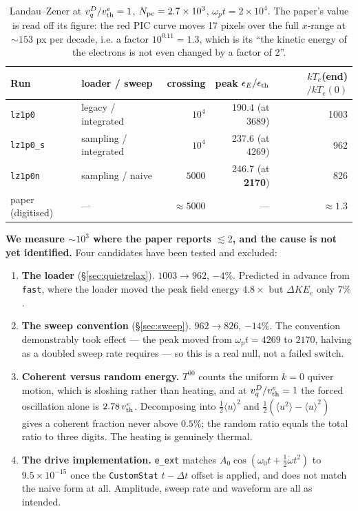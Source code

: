 \documentclass[11pt,a4paper]{article}
\newcommand{\code}[1]{\texttt{\small #1}}
\newcommand{\wpt}{\omega_p t}
\newcommand{\vth}{v_{\rm th}^{e}}
\newcommand{\Npc}{N_{\rm pc}}
\begin{document}
\begin{table}[h]
\centering\small
\begin{tabular}{@{}llrrr@{}}
\toprule
Run & loader / sweep & crossing & peak $\epsilon_E/\epsilon_{\rm th}$ & $kT_e$(end)$/kT_e(0)$ \\
\midrule
\code{lz1p0}   & legacy / integrated   & $10^4$ & 190.4 (at 3689) & 1003 \\
\code{lz1p0\_s}& sampling / integrated & $10^4$ & 237.6 (at 4269) & 962 \\
\code{lz1p0n}  & sampling / naive      & $5000$ & 246.7 (at \textbf{2170}) & 826 \\
\midrule
paper (digitised) & --- & ${\approx}5000$ & --- & \textbf{${\approx}1.3$} \\
\bottomrule
\end{tabular}
\caption{Landau--Zener at $v_q^D/\vth = 1$, $\Npc = 2.7\times10^3$, $\wpt = 2\times10^4$.
The paper's value is read off its figure: the red PIC curve moves 17 pixels over the
full $x$-range at ${\sim}153$ px per decade, i.e. a factor $10^{0.11} = 1.3$, which is
its ``the kinetic energy of the electrons is not even changed by a factor of 2''.}
\end{table}

\textbf{We measure ${\sim}10^3$ where the paper reports ${\lesssim}2$, and the cause
is not yet identified.} Four candidates have been tested and excluded:

\begin{enumerate}[nosep]
  \item \textbf{The loader} (\S\ref{sec:quietrelax}). $1003 \rightarrow 962$, $-4\%$.
        Predicted in advance from \code{fast}, where the loader moved the peak field
        energy $4.8\times$ but $\Delta KE_e$ only $7\%$.
  \item \textbf{The sweep convention} (\S\ref{sec:sweep}). $962 \rightarrow 826$,
        $-14\%$. The convention demonstrably took effect --- the peak moved from
        $\wpt = 4269$ to $2170$, halving as a doubled sweep rate requires --- so this
        is a real null, not a failed switch.
  \item \textbf{Coherent versus random energy.} $T^{00}$ counts the uniform $k=0$
        quiver motion, which is sloshing rather than heating, and at
        $v_q^D/\vth = 1$ the forced oscillation alone is $2.78\,\vth$. Decomposing
        into $\tfrac12\langle u\rangle^2$ and
        $\tfrac12(\langle u^2\rangle - \langle u\rangle^2)$ gives a coherent fraction
        never above $0.5\%$; the random ratio equals the total ratio to three digits.
        The heating is genuinely thermal.
  \item \textbf{The drive implementation.} \code{e\_ext} matches
        $A_0\cos(\omega_0 t + \tfrac12\dot\omega t^2)$ to $9.5\times10^{-15}$ once the
        \code{CustomStat} $t-\Delta t$ offset is applied, and does not match the naive
        form at all. Amplitude, sweep rate and waveform are all as intended.
\end{enumerate}
\end{document}
